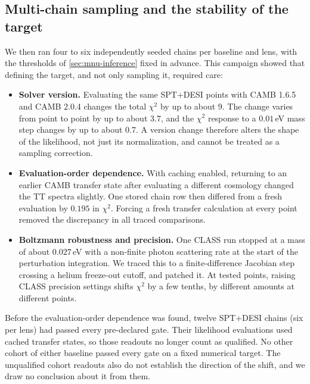 \subsection{Multi-chain sampling and the stability of the target}
We then ran four to six independently seeded chains per baseline and lens, with the thresholds of \cref{sec:mnu-inference} fixed in advance. This campaign showed that defining the target, and not only sampling it, required care:
\begin{itemize}[leftmargin=*, itemsep=2pt]
  \item \textbf{Solver version.} Evaluating the same SPT+DESI points with CAMB 1.6.5 and CAMB 2.0.4 changes the total $\chi^2$ by up to about 9. The change varies from point to point by up to about 3.7, and the $\chi^2$ response to a $0.01$\,eV mass step changes by up to about 0.7. A version change therefore alters the shape of the likelihood, not just its normalization, and cannot be treated as a sampling correction.
  \item \textbf{Evaluation-order dependence.} With caching enabled, returning to an earlier CAMB transfer state after evaluating a different cosmology changed the TT spectra slightly. One stored chain row then differed from a fresh evaluation by $0.195$ in $\chi^2$. Forcing a fresh transfer calculation at every point removed the discrepancy in all traced comparisons.
  \item \textbf{Boltzmann robustness and precision.} One CLASS run stopped at a mass of about $0.027$\,eV with a non-finite photon scattering rate at the start of the perturbation integration. We traced this to a finite-difference Jacobian step crossing a helium freeze-out cutoff, and patched it. At tested points, raising CLASS precision settings shifts $\chi^2$ by a few tenths, by different amounts at different points.
\end{itemize}
Before the evaluation-order dependence was found, twelve SPT+DESI chains (six per lens) had passed every pre-declared gate. Their likelihood evaluations used cached transfer states, so those readouts no longer count as qualified. No other cohort of either baseline passed every gate on a fixed numerical target. The unqualified cohort readouts also do not establish the direction of the shift, and we draw no conclusion about it from them.

